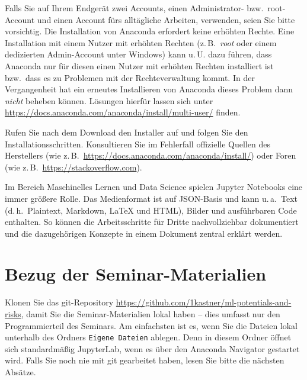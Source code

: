 \documentclass{tufte-handout}
\begin{document}
Falls Sie auf Ihrem Endgerät zwei Accounts, einen Administrator- bzw.\ root-Account und einen Account fürs alltägliche Arbeiten, verwenden, seien Sie bitte vorsichtig.
Die Installation von Anaconda erfordert keine erhöhten Rechte.
Eine Installation mit einem Nutzer mit erhöhten Rechten (z.\,B.\ \emph{root} oder einem dedizierten Admin-Account unter Windows) kann u.\,U. dazu führen, dass Anaconda nur für diesen einen Nutzer mit erhöhten Rechten installiert ist bzw.\ dass es zu Problemen mit der Rechteverwaltung kommt.
In der Vergangenheit hat ein erneutes Installieren von Anaconda dieses Problem dann \emph{nicht} beheben können.
Lösungen hierfür lassen sich unter \url{https://docs.anaconda.com/anaconda/install/multi-user/} finden. 

Rufen Sie nach dem Download den Installer auf und folgen Sie den Installationsschritten.
Konsultieren Sie im Fehlerfall offizielle Quellen des Herstellers (wie z.\,B.\ \url{https://docs.anaconda.com/anaconda/install/})
oder Foren (wie z.\,B.\ \url{https://stackoverflow.com}).


Im Bereich Maschinelles Lernen und Data Science spielen Jupyter Notebooks eine immer größere Rolle.
Das Medienformat ist auf JSON-Basis und kann u.\,a.\
Text (d.\,h.\ Plaintext, Markdown, LaTeX und HTML),
Bilder und
ausführbaren Code enthalten.
So können die Arbeitsschritte für Dritte nachvollziehbar dokumentiert und die dazugehörigen Konzepte in einem Dokument zentral erklärt werden.


\section{Bezug der Seminar-Materialien}
\label{sec:git-clone}

Klonen Sie das git-Repository
\url{https://github.com/1kastner/ml-potentials-and-risks},
damit Sie die Seminar-Materialien lokal haben -- dies umfasst nur den Programmierteil des Seminars.
Am einfachsten ist es, wenn Sie die Dateien lokal unterhalb des Ordners \texttt{Eigene Dateien} ablegen.
Denn in diesem Ordner öffnet sich standardmäßig JupyterLab, wenn es über den Anaconda Navigator gestartet wird.
Falls Sie noch nie mit git gearbeitet haben, lesen Sie bitte die nächsten Absätze.
\end{document}
